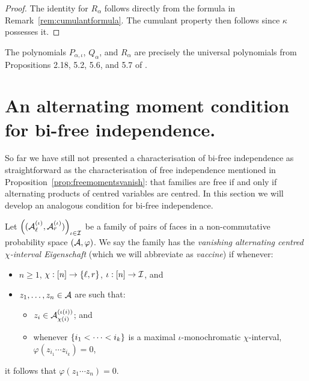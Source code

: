 \begin{proof}
	The identity for $R_\alpha$ follows directly from the formula in Remark~\ref{rem:cumulantformula}.
	The cumulant property then follows since $\kappa$ possesses it.
\end{proof}

The polynomials $P_{\alpha, \iota}$, $Q_\alpha$, and $R_\alpha$ are precisely the universal polynomials from Propositions 2.18, 5.2, 5.6, and 5.7 of \cite{voiculescu2014free}.


\section{An alternating moment condition for bi-free independence.}
So far we have still not presented a characterisation of bi-free independence as straightforward as the characterisation of free independence mentioned in Proposition~\ref{prop:freemomentsvanish}: that families are free if and only if alternating products of centred variables are centred.
In this section we will develop an analogous condition for bi-free independence.

\begin{definition}
	Let $\left((\mathcal{A}_\ell^{(\iota)}, \mathcal{A}_r^{(\iota)})\right)_{\iota\in\mathcal{I}}$ be a family of pairs of faces in a non-commutative probability space $(\mathcal{A}, \varphi)$.
	We say the family has the \emph{vanishing alternating centred $\chi$-interval Eigenschaft} (which we will abbreviate as \emph{vaccine}) if whenever:
	\begin{itemize}
		\item $n \geq 1$, $\chi : [n] \to \left\{\ell, r\right\}$, $\iota : [n] \to \mathcal{I}$, and
		\item $z_1, \ldots, z_n \in \mathcal{A}$ are such that:
			\begin{itemize}
				\item $z_i \in \mathcal{A}_{\chi(i)}^{(\iota(i))}$; and
				\item whenever $\left\{i_1 < \cdots < i_k\right\}$ is a maximal $\iota$-monochromatic $\chi$-interval, $\varphi(z_{i_1}\cdots z_{i_k}) = 0$,
			\end{itemize}
	\end{itemize}
	it follows that $\varphi(z_1\cdots z_n) = 0$.
\end{definition}

